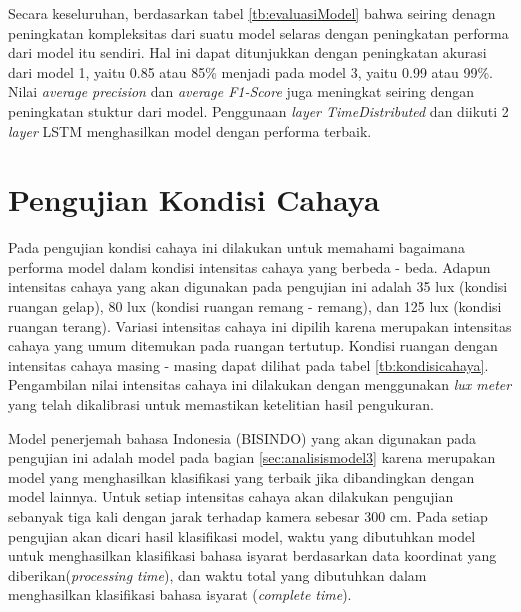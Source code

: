Secara keseluruhan, berdasarkan tabel \ref{tb:evaluasiModel} bahwa seiring denagn peningkatan kompleksitas dari suatu model selaras dengan peningkatan performa dari model itu sendiri. Hal ini dapat ditunjukkan dengan peningkatan akurasi dari model 1, yaitu 0.85 atau 85\% menjadi pada model 3, yaitu 0.99 atau 99\%. Nilai \emph{average precision} dan \emph{average F1-Score} juga meningkat seiring dengan peningkatan stuktur dari model. Penggunaan \emph{layer TimeDistributed} dan diikuti 2 \emph{layer} LSTM menghasilkan model dengan performa terbaik.

\section{Pengujian Kondisi Cahaya}
\label{sec:analisiscahaya}

Pada pengujian kondisi cahaya ini dilakukan untuk memahami bagaimana performa model dalam kondisi intensitas cahaya  yang berbeda - beda. Adapun intensitas cahaya yang akan digunakan pada pengujian ini adalah 35 lux (kondisi ruangan gelap), 80 lux (kondisi ruangan remang - remang), dan 125 lux (kondisi ruangan terang). Variasi intensitas cahaya ini dipilih karena merupakan intensitas cahaya yang umum ditemukan pada ruangan tertutup. Kondisi ruangan dengan intensitas cahaya masing - masing dapat dilihat pada tabel \ref{tb:kondisicahaya}. Pengambilan nilai intensitas cahaya ini dilakukan dengan menggunakan \emph{lux meter} yang telah dikalibrasi untuk memastikan ketelitian hasil pengukuran.

Model penerjemah bahasa Indonesia (BISINDO) yang akan digunakan pada pengujian ini adalah model pada bagian \ref{sec:analisismodel3} karena merupakan model yang menghasilkan klasifikasi yang terbaik jika dibandingkan dengan model lainnya. Untuk setiap intensitas cahaya akan dilakukan pengujian sebanyak tiga kali dengan jarak terhadap kamera sebesar 300 cm. Pada setiap pengujian akan dicari hasil klasifikasi model, waktu yang dibutuhkan model untuk menghasilkan klasifikasi bahasa isyarat berdasarkan data koordinat yang diberikan(\emph{processing time}), dan waktu total yang dibutuhkan dalam menghasilkan klasifikasi bahasa isyarat (\emph{complete time}).  

